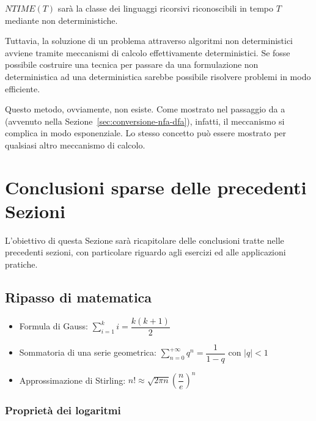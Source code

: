 \documentclass[italian, 10pt]{article}
\begin{document}
\(NTIME(T)\) sarà la classe dei linguaggi ricorsivi riconoscibili in tempo \(T\) mediante \TM non deterministiche.

Tuttavia, la soluzione di un problema attraverso algoritmi non deterministici avviene tramite meccanismi di calcolo effettivamente deterministici.
Se fosse possibile costruire una tecnica  per passare da una formulazione non deterministica ad una deterministica sarebbe possibile risolvere problemi  in modo efficiente.

Questo metodo, ovviamente, non esiste.
Come mostrato nel passaggio da \FSA a \NFA (avvenuto nella Sezione~\ref{sec:conversione-nfa-dfa}), infatti, il meccanismo si complica in modo esponenziale.
Lo stesso concetto può essere mostrato per qualsiasi altro meccanismo di calcolo.

\clearpage

\section{Conclusioni sparse delle precedenti Sezioni}

L'obiettivo di questa Sezione sarà ricapitolare delle conclusioni tratte nelle precedenti sezioni, con particolare riguardo agli esercizi ed alle applicazioni pratiche.

\subsection{Ripasso di matematica}

\begin{itemize}
  \item Formula di Gauss: \(\displaystyle \sum_{i=1}^k i = \dfrac{k(k+1)}{2}\)
  \item Sommatoria di una serie geometrica: \(\displaystyle \sum_{n=0}^{+\infty} q^n = \dfrac{1}{1-q}\) con \(|q| < 1\)
  \item Approssimazione di Stirling: \(n! \approx \displaystyle \sqrt{2 \pi n} \left(\dfrac{n}{e}\right)^n\)
\end{itemize}

\subsubsection{Proprietà dei logaritmi}
\end{document}
